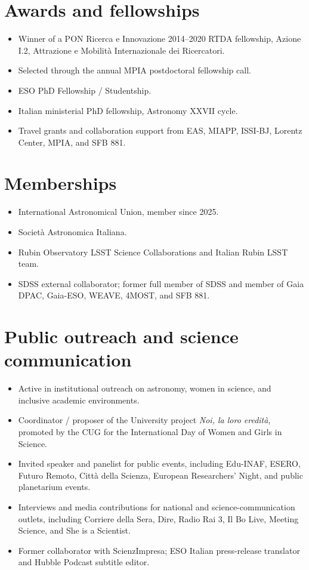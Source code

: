 \documentclass[11pt,a4paper]{article}
\begin{document}
\section*{Awards and fellowships}
\begin{itemize}
    \item Winner of a PON Ricerca e Innovazione 2014--2020 RTDA fellowship, Azione I.2, Attrazione e Mobilit\`a Internazionale dei Ricercatori.
    \item Selected through the annual MPIA postdoctoral fellowship call.
    \item ESO PhD Fellowship / Studentship.
    \item Italian ministerial PhD fellowship, Astronomy XXVII cycle.
    \item Travel grants and collaboration support from EAS, MIAPP, ISSI-BJ, Lorentz Center, MPIA, and SFB 881.
\end{itemize}

\section*{Memberships}
\begin{itemize}
    \item International Astronomical Union, member since 2025.
    \item Societ\`a Astronomica Italiana.
    \item Rubin Observatory LSST Science Collaborations and Italian Rubin LSST team.
    \item SDSS external collaborator; former full member of SDSS and member of Gaia DPAC, Gaia-ESO, WEAVE, 4MOST, and SFB 881.
\end{itemize}

\section*{Public outreach and science communication}
\begin{itemize}
    \item Active in institutional outreach on astronomy, women in science, and inclusive academic environments.
    \item Coordinator / proposer of the University project \textit{Noi, la loro eredit\`a}, promoted by the CUG for the International Day of Women and Girls in Science.
    \item Invited speaker and panelist for public events, including Edu-INAF, ESERO, Futuro Remoto, Citt\`a della Scienza, European Researchers' Night, and public planetarium events.
    \item Interviews and media contributions for national and science-communication outlets, including Corriere della Sera, Dire, Radio Rai 3, Il Bo Live, Meeting Science, and She is a Scientist.
    \item Former collaborator with ScienzImpresa; ESO Italian press-release translator and Hubble Podcast subtitle editor.
\end{itemize}
\end{document}

